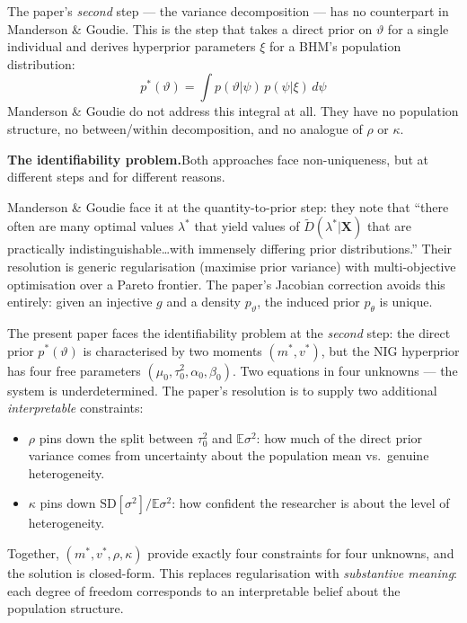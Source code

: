 \documentclass[12pt,a4paper]{article}
\newcommand{\E}{\mathbb{E}}
\newcommand{\SD}{\mathrm{SD}}
\begin{document}
The paper's \emph{second} step --- the variance decomposition --- has no
counterpart in Manderson \& Goudie. This is the step that takes a direct prior
on $\vartheta$ for a single individual and derives hyperprior parameters $\xi$
for a BHM's population distribution:
\[
  p^*(\vartheta) = \int p(\vartheta|\psi)\, p(\psi|\xi)\, d\psi
\]
Manderson \& Goudie do not address this integral at all. They have no
population structure, no between/within decomposition, and no analogue of
$\rho$ or $\kappa$.

\medskip
\noindent\textbf{The identifiability problem.}\quad Both approaches face
non-uniqueness, but at different steps and for different reasons.

Manderson \& Goudie face it at the quantity-to-prior step: they note that
``there often are many optimal values $\lambda^*$ that yield values of
$\tilde{D}(\lambda^*|\mathbf{X})$ that are practically
indistinguishable\ldots with immensely differing prior distributions.'' Their
resolution is generic regularisation (maximise prior variance) with
multi-objective optimisation over a Pareto frontier. The paper's Jacobian
correction avoids this entirely: given an injective $g$ and a density
$p_\vartheta$, the induced prior $p_\theta$ is unique.

The present paper faces the identifiability problem at the \emph{second} step:
the direct prior $p^*(\vartheta)$ is characterised by two moments $(m^*, v^*)$,
but the NIG hyperprior has four free parameters
$(\mu_0, \tau_0^2, \alpha_0, \beta_0)$. Two equations in four unknowns --- the
system is underdetermined. The paper's resolution is to supply two additional
\emph{interpretable} constraints:
\begin{itemize}
  \item $\rho$ pins down the split between $\tau_0^2$ and $\E{\sigma^2}$:
    how much of the direct prior variance comes from uncertainty about the
    population mean vs.\ genuine heterogeneity.
  \item $\kappa$ pins down $\SD[\sigma^2]/\E{\sigma^2}$: how confident the
    researcher is about the level of heterogeneity.
\end{itemize}
Together, $(m^*, v^*, \rho, \kappa)$ provide exactly four constraints for four
unknowns, and the solution is closed-form. This replaces regularisation with
\emph{substantive meaning}: each degree of freedom corresponds to an
interpretable belief about the population structure.
\end{document}
